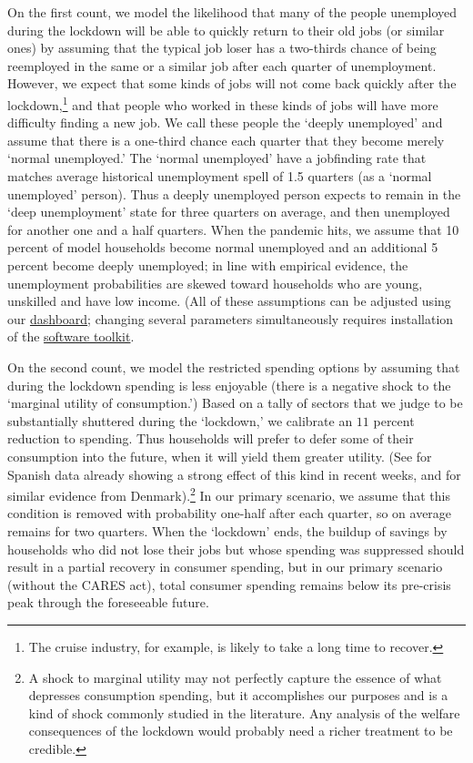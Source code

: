 \documentclass[titlepage,a4paper]{\econtex}
\begin{document}
On the first count, we model the likelihood that many of the people unemployed during the lockdown will be able to quickly return to their old jobs (or similar ones) by assuming that the typical job loser has a two-thirds chance of being reemployed in the same or a similar job after each quarter of unemployment.  However, we expect that some kinds of jobs will not come back quickly after the lockdown,\footnote{The cruise industry, for example, is likely to take a long time to recover.} and that people who worked in these kinds of jobs will have more difficulty finding a new job.  We call these people the `deeply unemployed' and assume that there is a one-third chance each quarter that they become merely `normal unemployed.'  The `normal unemployed' have a jobfinding rate that matches average historical unemployment spell of 1.5 quarters (as a `normal unemployed' person).  Thus a deeply unemployed person expects to remain in the `deep unemployment' state for three quarters on average, and then unemployed for another one and a half quarters.  When the pandemic hits, we assume that 10 percent of model households become normal unemployed and an additional 5 percent become deeply unemployed; in line with empirical evidence, the unemployment probabilities are skewed toward households who are young, unskilled and have low income.  (All of these assumptions can be adjusted using our \href{http://econ-ark.org/pandemicdashboard}{dashboard}; changing several parameters simultaneously requires installation of the \href{https://github.com/econ-ark/Pandemic}{software toolkit}.

On the second count, we model the restricted spending options by assuming that during the lockdown spending is less enjoyable (there is a negative shock to the `marginal utility of consumption.')
Based on a tally of sectors that we judge to be substantially shuttered during the `lockdown,' we calibrate an $11$ percent reduction to spending.
Thus households will prefer to defer some of their consumption into the future, when it will yield them greater utility. (See \cite{SpanishSpending} for Spanish data already showing a strong effect of this kind in recent weeks, and \cite{denmark_pandemics} for similar evidence from Denmark).\footnote{A shock to marginal utility may not perfectly capture the essence of what depresses consumption spending, but it accomplishes our purposes and is a kind of shock commonly studied in the literature.  Any analysis of the welfare consequences of the lockdown would probably need a richer treatment to be credible.}
In our primary scenario, we assume that this condition is removed with probability one-half after each quarter, so on average remains for two quarters.  When the `lockdown' ends, the buildup of savings by households who did not lose their jobs but whose spending was suppressed should result in a partial recovery in consumer spending, but in our primary scenario (without the CARES act), total consumer spending remains below its pre-crisis peak through the foreseeable future.
\end{document}
